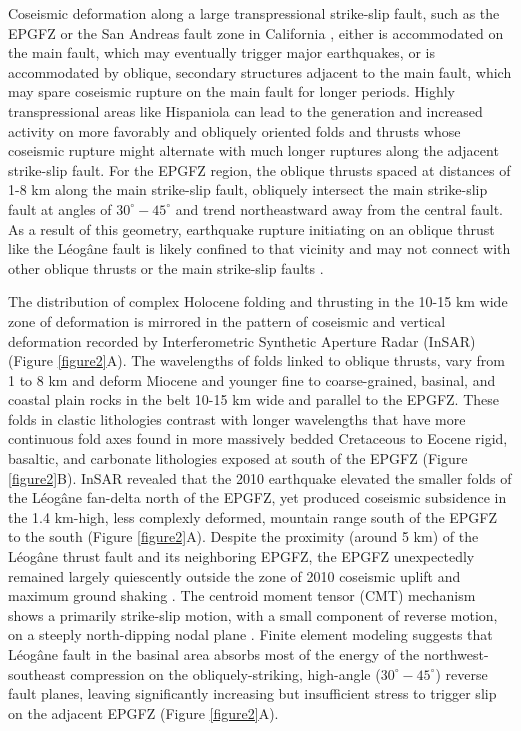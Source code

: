 \documentclass{nature}
\begin{document}
Coseismic deformation along a large transpressional strike-slip fault, such as the EPGFZ or the San Andreas fault zone in California \citep{segall1990surface}, either is accommodated on the main fault, which may eventually trigger major earthquakes, or is accommodated by oblique, secondary structures adjacent to the main fault, which may spare coseismic rupture on the main fault for longer periods. Highly transpressional areas like Hispaniola can lead to the generation and increased activity on more favorably and obliquely oriented folds and thrusts whose coseismic rupture might alternate with much longer ruptures along the adjacent strike-slip fault. For the EPGFZ region, the oblique thrusts spaced at distances of 1-8 km along the main strike-slip fault, obliquely intersect the main strike-slip fault at angles of $30^{\circ}-45^{\circ}$ and trend northeastward away from the central fault. As a result of this geometry, earthquake rupture initiating on an oblique thrust like the L\'eog\^ane fault is likely confined to that vicinity and may not connect with other oblique thrusts or the main strike-slip faults \citep{douilly2015three}.

The distribution of complex Holocene folding and thrusting in the 10-15 km wide zone of deformation is mirrored in the pattern of coseismic and vertical deformation recorded by Interferometric Synthetic Aperture Radar (InSAR) \citep{hashimoto2011fan} (Figure \ref{figure2}A). The wavelengths of folds linked to oblique thrusts, vary from 1 to 8 km and deform Miocene and younger fine to coarse-grained, basinal, and coastal plain rocks in the belt 10-15 km wide and parallel to the EPGFZ. These folds in clastic lithologies contrast with longer wavelengths that have more continuous fold axes found in more massively bedded Cretaceous to Eocene rigid, basaltic, and carbonate lithologies exposed at south of the EPGFZ (Figure \ref{figure2}B). InSAR revealed that the 2010 earthquake elevated the smaller folds of the L\'eog\^ane fan-delta north of the EPGFZ, yet produced coseismic subsidence in the 1.4 km-high, less complexly deformed, mountain range south of the EPGFZ to the south \citep{hashimoto2011fan} (Figure \ref{figure2}A). Despite the proximity (around 5 km) of the L\'eog\^ane thrust fault and its neighboring EPGFZ, the EPGFZ unexpectedly remained largely quiescently outside the zone of 2010 coseismic uplift and maximum ground shaking \citep{nettles2010earthquake}. The centroid moment tensor (CMT) mechanism shows a primarily strike-slip motion, with a small component of reverse motion, on a steeply north-dipping nodal plane \citep{nettles2010earthquake,douilly2013crustal}. Finite element modeling \citep{douilly2015three} suggests that L\'eog\^ane fault in the basinal area absorbs most of the energy of the northwest-southeast compression on the obliquely-striking, high-angle ($30^{\circ}-45^{\circ}$) reverse fault planes, leaving significantly increasing but insufficient stress to trigger slip on the adjacent EPGFZ (Figure \ref{figure2}A).
\end{document}

